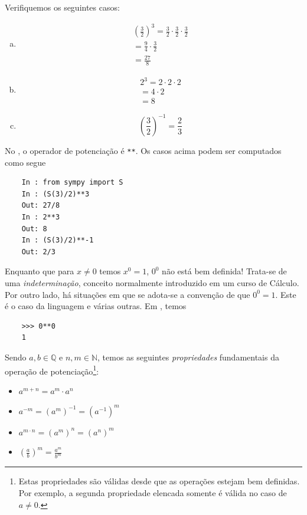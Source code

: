 \begin{ex}
  Verifiquemos os seguintes casos:
  \begin{enumerate}[a)]
  \item
    \begin{gather}
      \left(\frac{3}{2}\right)^3 = \frac{3}{2}\cdot\frac{3}{2}\cdot\frac{3}{2} \\
      = \frac{9}{4}\cdot\frac{3}{2} \\
      = \frac{27}{8}
    \end{gather}
  \item
    \begin{gather}
      2^3 = 2\cdot 2 \cdot 2 \\
      = 4\cdot 2\\
      = 8
    \end{gather}
  \item
    \begin{equation}
      \left(\frac{3}{2}\right)^{-1} = \frac{2}{3}
    \end{equation}
  \end{enumerate}

  \ifispython
  No \python, o operador de potenciação é \lstinline!**!. Os casos acima podem ser computados como segue
  \begin{lstlisting}
    In : from sympy import S
    In : (S(3)/2)**3
    Out: 27/8
    In : 2**3
    Out: 8
    In : (S(3)/2)**-1
    Out: 2/3
  \end{lstlisting}
  \fi
\end{ex}

\begin{obs}\label{obs:020}
  Enquanto que para $x\neq 0$ temos $x^0=1$, $0^0$ não está bem definida! Trata-se de uma \emph{indeterminação}, conceito normalmente introduzido em um curso de Cálculo. Por outro lado, há situações em que se adota-se a convenção de que $0^0=1$. Este é o caso da linguagem {\python} e várias outras.
  \ifispython
  Em {\python}, temos
  \begin{lstlisting}
    >>> 0**0
    1
  \end{lstlisting}
  \fi
\end{obs}

Sendo $a,b\in\mathbb{Q}$ e $n, m\in\mathbb{N}$, temos as seguintes \emph{propriedades} fundamentais da operação de potenciação\footnote{Estas propriedades são válidas desde que as operações estejam bem definidas. Por exemplo, a segunda propriedade elencada somente é válida no caso de $a\neq 0$.}:
\begin{itemize}
\item $a^{m+n} = a^m\cdot a^n$
\item $\displaystyle a^{-m} = \left(a^m\right)^{-1} = \left(a^{-1}\right)^m$
\item $\displaystyle a^{m\cdot n} = \left(a^m\right)^n = \left(a^n\right)^m$
\item $\displaystyle \left(\frac{a}{b}\right)^m = \frac{a^m}{b^m}$
\end{itemize}

